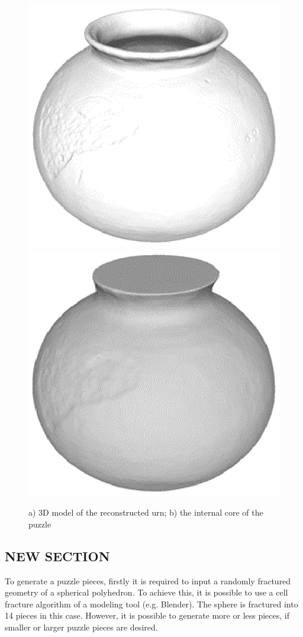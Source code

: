 \documentclass[acmlarge,screen]{acmart}
\begin{document}
\begin{figure}[h]
  \centering
  \includegraphics[width=0.45\linewidth]{images/3Dreconstruction}
  \includegraphics[width=0.45\linewidth]{images/core}
  \caption{\label{fig:reconstruction}
    a) 3D model of the reconstructed urn; b) the internal core of the puzzle}
\end{figure}


\subsection{NEW SECTION}
To generate a puzzle pieces, firstly it is required to input a randomly fractured geometry of a spherical polyhedron. To achieve this, it is possible to use a cell fracture algorithm of a modeling tool (e.g. Blender). The sphere is fractured into 14 pieces in this case. However, it is possible to generate more or less pieces, if smaller or larger puzzle pieces are desired. 
\end{document}
